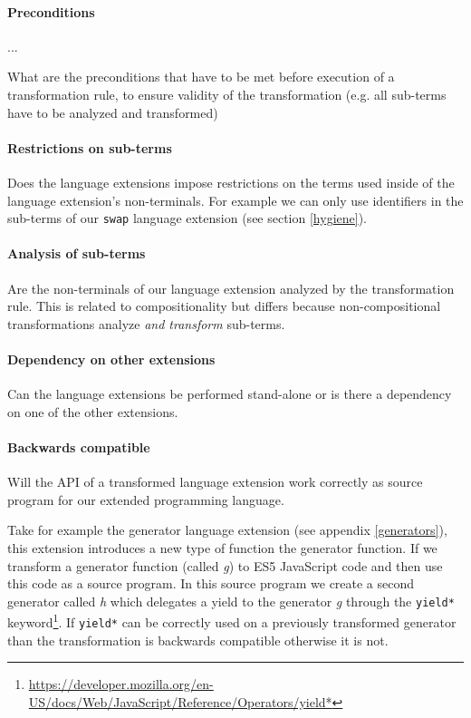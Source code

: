 \paragraph{Preconditions}

...

What are the preconditions that have to be met before execution of a transformation rule, to ensure validity of the transformation (e.g. all sub-terms have to be analyzed and transformed)

\paragraph{Restrictions on sub-terms}
Does the language extensions impose restrictions on the terms used inside of the language extension's non-terminals. For example we can only use identifiers in the sub-terms of our \lstinline$swap$ language extension (see section \ref{hygiene}).

\paragraph{Analysis of sub-terms}
Are the non-terminals of our language extension analyzed by the transformation rule. This is related to compositionality but differs because non-compositional transformations analyze \textit{and transform} sub-terms.

\paragraph{Dependency on other extensions}
Can the language extensions be performed stand-alone or is there a dependency on one of the other extensions.

\paragraph{Backwards compatible}
Will the API of a transformed language extension work correctly as source program for our extended programming language. 

Take for example the generator language extension (see appendix \ref{generators}), this extension introduces a new type of function the generator function. If we transform a generator function (called \textit{g}) to ES5 JavaScript code and then use this code as a source program. In this source program we create a second generator called \textit{h} which delegates a yield to the generator \textit{g} through the \lstinline$yield*$ keyword\footnote{\url{https://developer.mozilla.org/en-US/docs/Web/JavaScript/Reference/Operators/yield*}}. If \lstinline$yield*$ can be correctly used on a previously transformed generator than the transformation is backwards compatible otherwise it is not.

